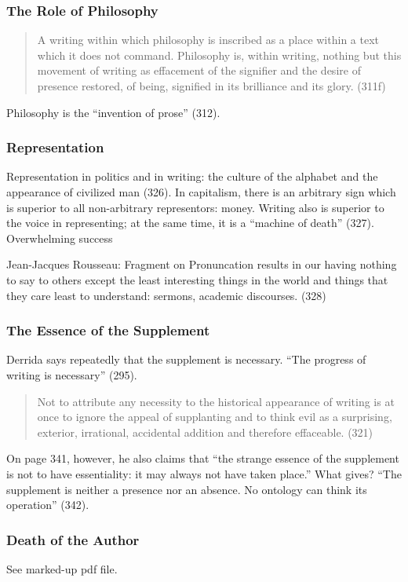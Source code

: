 \documentclass[xcolor=dvipsnames]{beamer}
\begin{document}
\begin{frame}
  \frametitle{The Role of Philosophy}
  \begin{quote}
    A writing within which philosophy is inscribed as a place within
    a text which it does not command. Philosophy is, within writing,
    nothing but this movement of writing as effacement of the
    signifier and the desire of presence restored, of being, signified
    in its brilliance and its glory. (311f)
  \end{quote}
  Philosophy is the ``invention of prose'' (312). 
\end{frame}

\begin{frame}
  \frametitle{Representation}
  Representation in politics and in writing: the culture of the
  alphabet and the appearance of civilized man (326). In capitalism,
  there is an arbitrary sign which is superior to all non-arbitrary
  representors: money. Writing also is superior to the voice in
  representing; at the same time, it is a ``machine of death'' (327).
  Overwhelming success 
  \begin{block}{Jean-Jacques Rousseau: Fragment on Pronuncation}
    results in our having nothing to say to others except the least
    interesting things in the world and things that they care least to
    understand: sermons, academic discourses. (328)
  \end{block}
\end{frame}

\begin{frame}
  \frametitle{The Essence of the Supplement}
  Derrida says repeatedly that the supplement is necessary. ``The
  progress of writing is necessary'' (295). 
  \begin{quote}
    Not to attribute any necessity to the historical appearance of
    writing is at once to ignore the appeal of supplanting and to
    think evil as a surprising, exterior, irrational, accidental
    addition and therefore effaceable. (321)
  \end{quote}
  On page 341, however, he also claims that ``the strange essence of
  the supplement is not to have essentiality: it may always not have
  taken place.'' What gives? ``The supplement is neither a presence
  nor an absence. No ontology can think its operation'' (342).
\end{frame}

\begin{frame}
  \frametitle{Death of the Author}
See marked-up pdf file.  
\end{frame}
\end{document}
